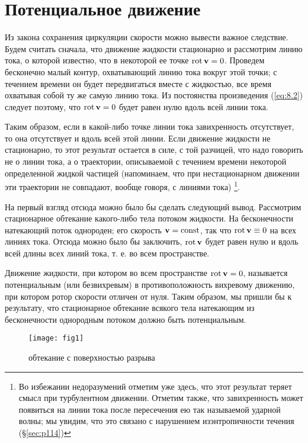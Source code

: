 \section{Потенциальное движение}
\label{sec:p9}

Из закона сохранения циркуляции скорости можно вывести важное следствие. Будем
считать сначала, что движение жидкости стационарно и рассмотрим линию тока, о
которой известно, что в некоторой ее точке $\mathop{\mathrm{rot}}\nolimits{ \mathbf{v} } = 0$. Проведем бесконечно
малый контур, охватывающий линию тока вокруг этой точки; с течением времени он
будет передвигаться вместе с жидкостью, все время охватывая собой ту же самую
линию тока. Из постоянства произведения (\ref{eq:8.2}) следует поэтому, что $\mathop{\mathrm{rot}}\nolimits{ \mathbf{v} } = 0$
будет равен нулю вдоль всей линии тока.

Таким образом, если в какой-либо точке линии тока завихренность отсутствует, то
она отсутствует и вдоль всей этой линии. Если движение жидкости не стационарно,
то этот результат остается в силе, с той разчицей, что надо говорить не о линии
тока, а о траектории, описываемой с течением времени некоторой определенной
жидкой частицей (напоминаем, что при нестационарном движении эти траектории не
совпадают, вообще говоря, с линиями тока) \footnote{Во избежании недоразумений
отметим уже здесь, что этот результат теряет смысл при турбулентном движении.
Отметим также, что завихренность может появиться на линии тока после пересечения
ею так называемой ударной волны; мы увидим, что это связано с нарушением изэнтропичности
течения (\S\ref{sec:p114})}.

На первый взгляд отсюда можно было бы сделать следующий вывод. Рассмотрим
стационарное обтекание какого-либо тела потоком жидкости. На бесконечности
натекающий поток однороден; его скорость ${\mathbf{v}} = \mathop{\mathrm{const}}\nolimits$, так что $\mathop{\mathrm{rot}}\nolimits{ \mathbf{v} } \equiv
 0$ на всех линиях тока. Отсюда можно было бы заключить, $\mathop{\mathrm{rot}}\nolimits{ \mathbf{v} }$ будет равен
нулю и вдоль всей длины всех линий тока, т. е. во всем пространстве.

Движение жидкости, при котором во всем пространстве $\mathop{\mathrm{rot}}\nolimits{ \mathbf{v} } = 0$, называется
потенциальным (или безвихревым) в противоположность вихревому движению, при
котором ротор скорости отличен от нуля. Таким образом, мы пришли бы к
результату, что стационарное обтекание всякого тела натекающим из бесконечности
однородным потоком должно быть потенциальным.

\begin{wrapfigure}{r}{6cm}
  \centering
  \texttt{[image: fig1]}
  \caption{обтекание с поверхностью разрыва}
  \label{fig:f1}
\end{wrapfigure}

